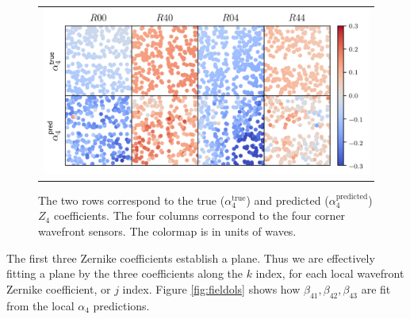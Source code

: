 \begin{figure}[!htbp]
\begin{center}
\begin{tabular}{c}
\includegraphics[width=\textwidth]{figs/interp/rafts.png}
\end{tabular}
\end{center}
\caption[Local Wavefront Predictions Across Four Wavefront Sensors]{The two rows correspond to the true ($\alpha_4^{\text{true}}$) and predicted ($\alpha_4^{\text{predicted}}$) $Z_4$ coefficients. The four columns correspond to the four corner wavefront sensors. The colormap is in units of waves.\label{fig:rafts}}
\end{figure}

The first three Zernike coefficients establish a plane. Thus we are effectively fitting a plane by the three coefficients along the $k$ index, for each local wavefront Zernike coefficient, or $j$ index. Figure \ref{fig:fieldols} shows how $\beta_{41}, \beta_{42}, \beta_{43}$ are fit from the local $\alpha_4$ predictions.

